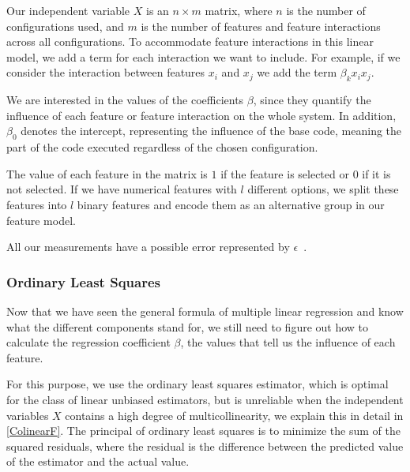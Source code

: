 Our independent variable $X$ is an $n \times m$ matrix, where $n$ is the number of configurations used, 
and $m$ is the number of features and feature interactions across all configurations. 
To accommodate feature interactions in this linear model, we add a term for each interaction we want to include. 
For example, if we consider the interaction between features $x_i$ and $x_j$ we add the term $\beta_k x_i x_j$. 

We are interested in the values of the coefficients $\beta$, since they quantify the influence of each feature or feature interaction on the whole system. 
In addition, $\beta_0$ denotes the intercept, representing the influence of the base code, 
meaning the part of the code executed regardless of the chosen configuration.

The value of each feature in the matrix is $1$ if the feature is selected or $0$ if it is not selected.  If we have numerical features with $l$ different options, 
we split these features into $l$ binary features and encode them as an alternative group in our feature model.

All our measurements have a possible error represented by $\epsilon$~\cite{Linear-Regression}.

\subsubsection{Ordinary Least Squares}\label{ch:OLS}
Now that we have seen the general formula of multiple linear regression and know what the different components stand for, we still need to figure out 
how to calculate the regression coefficient $\beta$, the values that tell us the influence of each feature. 

For this purpose, we use the ordinary least squares estimator, which is optimal for the class of linear unbiased estimators, 
but is unreliable when the independent variables $X$ contains a high degree of multicollinearity, we explain this in detail in \autoref{ColinearF}.
The principal of ordinary least squares is to minimize the sum of the squared residuals, where the residual is the difference between
the predicted value of the estimator and the actual value.~\cite{Linear-Regression}


